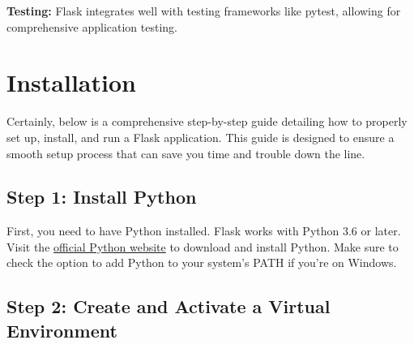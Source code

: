 \textbf{Testing:} Flask integrates well with testing frameworks like pytest, allowing for comprehensive application testing.\cite{Flaskdocs:2024}






\section{Installation}

Certainly, below is a comprehensive step-by-step guide detailing how to properly set up, install, and run a Flask application. This guide is designed to ensure a smooth setup process that can save you time and trouble down the line.

\subsection{Step 1: Install Python}

First, you need to have Python installed. Flask works with Python 3.6 or later. Visit the \href{https://www.python.org/downloads/}{official Python website} to download and install Python. Make sure to check the option to add Python to your system's PATH if you're on Windows.

\subsection{Step 2: Create and Activate a Virtual Environment}

